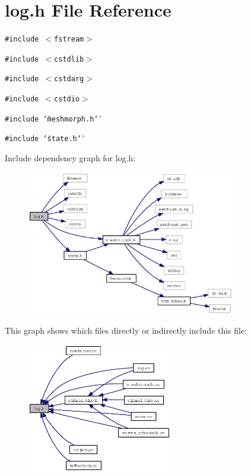 \section{log.h File Reference}
\label{log_8h}
{\tt \#include $<$fstream$>$}\par
{\tt \#include $<$cstdlib$>$}\par
{\tt \#include $<$cstdarg$>$}\par
{\tt \#include $<$cstdio$>$}\par
{\tt \#include \char`\"{}meshmorph.h\char`\"{}}\par
{\tt \#include \char`\"{}state.h\char`\"{}}\par


Include dependency graph for log.h:\begin{figure}[H]
\begin{center}
\leavevmode
\includegraphics[width=258pt]{log_8h__incl}
\end{center}
\end{figure}


This graph shows which files directly or indirectly include this file:\begin{figure}[H]
\begin{center}
\leavevmode
\includegraphics[width=179pt]{log_8h__dep__incl}
\end{center}
\end{figure}
